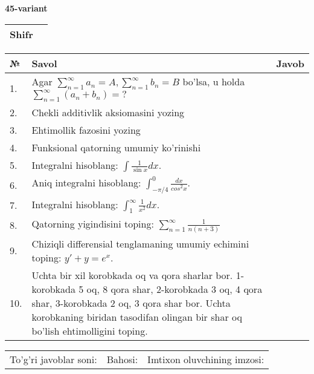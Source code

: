 \documentclass{article}
\begin{document}
  \egroup
  
  \newpage
  
  
  \textbf{45-variant}\\
  
  \bgroup
  \def\arraystretch{1.6} %
  
  \begin{tabular}{|m{5.7cm}|m{9.5cm}|}
  \hline
  Shifr & \\
  \hline
  \end{tabular}
  
  \vspace{1cm}
  
  \begin{tabular}{|m{0.7cm}|m{10cm}|m{4cm}|}
  \hline
  № & Savol & Javob \\
  \hline
  1. & Agar \(\sum_{n = 1}^{\infty}a_{n} = A,\sum_{n = 1}^{\infty}b_{n} = B\) bo'lsa, u holda \(\sum_{n = 1}^{\infty}\left( a_{n} + b_{n} \right) = ?\) &  \\
  \hline
  2. & Chekli additivlik aksiomasini yozing &  \\
  \hline
  3. & Ehtimollik fazosini yozing &  \\
  \hline
  4. & Funksional qatorning umumiy ko'rinishi &  \\
  \hline
  5. & Integralni hisoblang: \(\int {\frac{1}{\sin x}dx}\). &  \\
  \hline
  6. & Aniq integralni hisoblang: \(\int_{- \pi/4}^{0}\frac{dx}{cos^{2}x}\). &  \\
  \hline
  7. & Integralni hisoblang: \(\int_{1}^{\infty}{\frac{1}{x^{2}}dx}\). &  \\
  \hline
  8. & Qatorning yigindisini toping: \(\sum_{n = 1}^{\infty}\frac{1}{n(n + 3)}\) &  \\
  \hline
  9. & Chiziqli differensial tenglamaning umumiy echimini toping: \(y' + y = e^{x}\). &  \\
  \hline
  10. & Uchta bir xil korobkada oq va qora sharlar bor. 1-korobkada 5 oq, 8 qora shar, 2-korobkada 3 oq, 4 qora shar, 3-korobkada 2 oq, 3 qora shar bor. Uchta korobkaning biridan tasodifan olingan bir shar oq bo'lish ehtimolligini toping. &  \\
  \hline
  \end{tabular}
  
  \vspace{1cm}
  
  \begin{tabular}{lll}
  To'g'ri javoblar soni: \underline{\hspace{1.5cm}} & 
  Bahosi: \underline{\hspace{1.5cm}} & 
  Imtixon oluvchining imzosi: \underline{\hspace{2cm}} \\
  \end{tabular}
  
\end{document}
